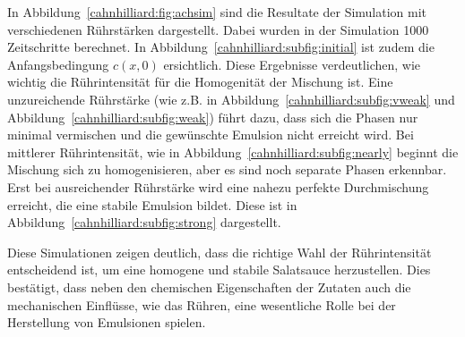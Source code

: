 In Abbildung~\ref{cahnhilliard:fig:achsim}
sind die Resultate der Simulation mit verschiedenen Rührstärken dargestellt.
Dabei wurden in der Simulation 1000 Zeitschritte berechnet.
In Abbildung~\ref{cahnhilliard:subfig:initial}
ist zudem die Anfangsbedingung $c(x,0)$ ersichtlich.
Diese Ergebnisse verdeutlichen,
wie wichtig die Rührintensität für die Homogenität der Mischung ist.
Eine unzureichende Rührstärke
(wie z.B. in Abbildung~\ref{cahnhilliard:subfig:vweak}
und Abbildung~\ref{cahnhilliard:subfig:weak})
führt dazu,
dass sich die Phasen nur minimal vermischen
und die gewünschte Emulsion nicht erreicht wird.
Bei mittlerer Rührintensität,
wie in Abbildung~\ref{cahnhilliard:subfig:nearly}
beginnt die Mischung sich zu homogenisieren,
aber es sind noch separate Phasen erkennbar.
Erst bei ausreichender Rührstärke wird eine nahezu perfekte Durchmischung erreicht,
die eine stabile Emulsion bildet.
Diese ist in Abbildung~\ref{cahnhilliard:subfig:strong} dargestellt.

Diese Simulationen zeigen deutlich,
dass die richtige Wahl der Rührintensität entscheidend ist,
um eine homogene und stabile Salatsauce herzustellen.
Dies bestätigt,
dass neben den chemischen Eigenschaften der Zutaten auch die mechanischen Einflüsse,
wie das Rühren, eine wesentliche Rolle bei der Herstellung von Emulsionen spielen.

